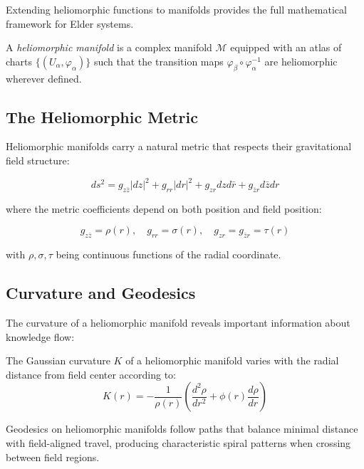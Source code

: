 \begin{definition}
\begin{theorem}
Extending heliomorphic functions to manifolds provides the full mathematical framework for Elder systems.

\begin{definition}
A \textit{heliomorphic manifold} is a complex manifold $\mathcal{M}$ equipped with an atlas of charts $\{(U_{\alpha}, \varphi_{\alpha})\}$ such that the transition maps $\varphi_{\beta} \circ \varphi_{\alpha}^{-1}$ are heliomorphic wherever defined.
\end{definition}

\subsection{The Heliomorphic Metric}

Heliomorphic manifolds carry a natural metric that respects their gravitational field structure:

\begin{equation}
ds^2 = g_{z\bar{z}}|dz|^2 + g_{rr}|dr|^2 + g_{z r}dz d\bar{r} + g_{\bar{z}r}d\bar{z}dr
\end{equation}

where the metric coefficients depend on both position and field position:

\begin{equation}
g_{z\bar{z}} = \rho(r), \quad g_{rr} = \sigma(r), \quad g_{z r} = g_{\bar{z}r} = \tau(r)
\end{equation}

with $\rho, \sigma, \tau$ being continuous functions of the radial coordinate.

\subsection{Curvature and Geodesics}

The curvature of a heliomorphic manifold reveals important information about knowledge flow:

\begin{proposition}
The Gaussian curvature $K$ of a heliomorphic manifold varies with the radial distance from field center according to:
\begin{equation}
K(r) = -\frac{1}{\rho(r)}\left(\frac{d^2\rho}{dr^2} + \phi(r)\frac{d\rho}{dr}\right)
\end{equation}
\end{proposition}

Geodesics on heliomorphic manifolds follow paths that balance minimal distance with field-aligned travel, producing characteristic spiral patterns when crossing between field regions.


\end{theorem}
\end{definition}
